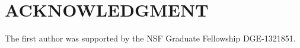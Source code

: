 







\section*{ACKNOWLEDGMENT}

The first author was supported by the NSF Graduate Fellowship DGE-1321851.









